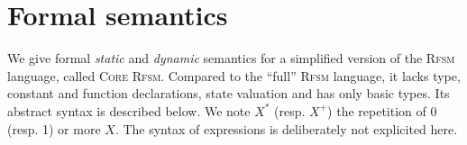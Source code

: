 \chapter{Formal semantics}
\label{cha:semantics}

\newcommand{\truev}{\mathsf{T}}
\newcommand{\tuple}[1]{\langle#1\rangle}
\newcommand{\ttuple}[2]{\langle#1, #2\rangle}
\newcommand{\tttuple}[3]{\langle#1, #2, #3\rangle}
\newcommand{\ttttuple}[4]{\langle#1, #2, #3, #4\rangle}
\newcommand{\tttttuple}[5]{\langle#1, #2, #3, #4, #5\rangle}
\newcommand{\ttttttuple}[6]{\langle#1, #2, #3, #4, #5, #6\rangle}
\newcommand{\tttttttuple}[7]{\langle#1, #2, #3, #4, #5, #6\rangle}
\newcommand{\ttttttttuple}[8]{\langle#1, #2, #3, #4, #5, #6\rangle}
\newcommand{\tuplen}[1]{\langle#1_1,\ldots,#1_n\rangle}
\newcommand{\tuplez}{\langle\rangle}
\newcommand{\cupp}[3]{\displaystyle{\bigcup_{#1}^{#2}}~#3}
\newcommand{\capp}[3]{\displaystyle{\bigcap_{#1}^{#2}}~#3}
\newcommand{\oplusn}[3]{\displaystyle{\bigoplus_{#1}^{#2}}~#3}
\newcommand{\valred}[2]{\rho_{#2}(#1)}
\newcommand{\emptyseq}{\langle\rangle}
\newcommand{\sequ}[1]{\langle#1\rangle}
\newcommand{\ssequ}[2]{\langle#1; #2\rangle}
\newcommand{\sssequ}[3]{\langle#1; #2; #3\rangle}
\newcommand{\sequn}[1]{\langle#1_1;\ldots;#1_n\rangle}
\newcommand{\sequm}[2]{\langle#1_1;\ldots;#1_#2\rangle}
\newcommand{\squn}[1]{#1_1,\ldots,#1_n}

\newcommand{\delt}[4]{\ttttuple{#1}{#2}{#3}{#4}}
\newcommand{\trans}[3]{#1 \xrightarrow{#2} #3}
\newcommand{\transs}[4]{#1 \xrightarrow[#3]{#2} #4}
\newcommand\doubleplus{+\kern-1.3ex+\kern0.8ex}

\newcommand{\larrow}{\xrightarrow}
\newcommand{\seqn}[3]{#3_#1,\ldots,#3_#2}
\newcommand{\cuppn}[1]{\cupp{i=1}{n}{#1}}
\newcommand{\setn}[1]{\{#1_1,\ldots,#1_n\}}
\newcommand{\mm}{\mathcal{M}}
\newcommand{\ssigma}{\overline{\sigma}}
\newcommand{\ssigm}{\overline{s}}
\newcommand{\eval}[2]{\mathcal{E}_{#1}\llbracket #2 \rrbracket}
\newcommand{\falln}[3]{\forall #1\in\{#2,\ldots,#3\}\quad}
\newcommand{\semfn}[3]{\mathcal{#1}_{#2}\llbracket #3 \rrbracket}
\newcommand{\vars}{\mathcal{V}}
\newcommand{\env}{\Gamma}
\newcommand{\expr}{\mathsf{e}}
\newcommand{\cupdot}{\mathbin{\mathaccent\cdot\cup}}

\vspace{-5mm}
We give formal \emph{static} and \emph{dynamic} semantics for a simplified version of the
\textsc{Rfsm} language, called \textsc{Core Rfsm}. Compared to the ``full'' \textsc{Rfsm} language,
it lacks type, constant and function declarations, state valuation and has only basic types. 
Its abstract syntax is described below. We note $X^*$ (resp. $X^+$) the repetition of 0
(resp. 1) or more $X$. The syntax of expressions is deliberately not explicited here. 

